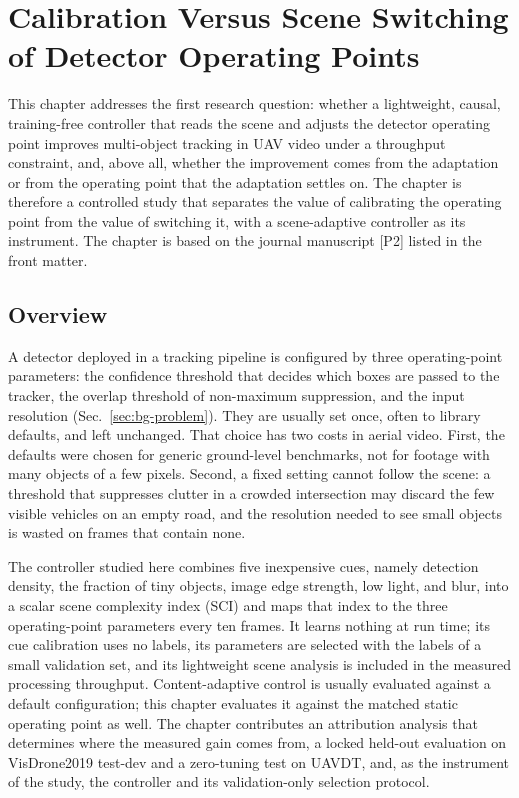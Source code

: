\chapter{Calibration Versus Scene Switching of Detector Operating Points}\label{ch:scene}

This chapter addresses the first research question: whether a lightweight, causal, training-free controller that reads the scene and adjusts the detector operating point improves multi-object tracking in UAV video under a throughput constraint, and, above all, whether the improvement comes from the adaptation or from the operating point that the adaptation settles on. The chapter is therefore a controlled study that separates the value of calibrating the operating point from the value of switching it, with a scene-adaptive controller as its instrument. The chapter is based on the journal manuscript [P2] listed in the front matter.

\section{Overview}\label{sec:ch4-overview}
A detector deployed in a tracking pipeline is configured by three operating-point parameters: the confidence threshold that decides which boxes are passed to the tracker, the overlap threshold of non-maximum suppression, and the input resolution (Sec.~\ref{sec:bg-problem}). They are usually set once, often to library defaults, and left unchanged. That choice has two costs in aerial video. First, the defaults were chosen for generic ground-level benchmarks, not for footage with many objects of a few pixels. Second, a fixed setting cannot follow the scene: a threshold that suppresses clutter in a crowded intersection may discard the few visible vehicles on an empty road, and the resolution needed to see small objects is wasted on frames that contain none.

The controller studied here combines five inexpensive cues, namely detection density, the fraction of tiny objects, image edge strength, low light, and blur, into a scalar scene complexity index (SCI) and maps that index to the three operating-point parameters every ten frames. It learns nothing at run time; its cue calibration uses no labels, its parameters are selected with the labels of a small validation set, and its lightweight scene analysis is included in the measured processing throughput. Content-adaptive control is usually evaluated against a default configuration; this chapter evaluates it against the matched static operating point as well. The chapter contributes an attribution analysis that determines where the measured gain comes from, a locked held-out evaluation on VisDrone2019 test-dev and a zero-tuning test on UAVDT, and, as the instrument of the study, the controller and its validation-only selection protocol.

